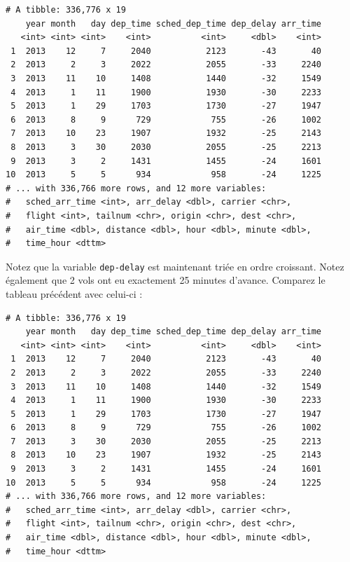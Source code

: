 \documentclass[a4paperpaper,]{article}
\newenvironment{Shaded}{\begin{snugshade}}{\end{snugshade}}
\newcommand{\KeywordTok}[1]{\textcolor[rgb]{0.12,0.11,0.11}{\textbf{#1}}}
\newcommand{\NormalTok}[1]{\textcolor[rgb]{0.12,0.11,0.11}{#1}}
\newcommand{\OperatorTok}[1]{\textcolor[rgb]{0.12,0.11,0.11}{#1}}
\newcommand{\StringTok}[1]{\textcolor[rgb]{0.75,0.01,0.01}{#1}}
\begin{document}
\begin{verbatim}
# A tibble: 336,776 x 19
    year month   day dep_time sched_dep_time dep_delay arr_time
   <int> <int> <int>    <int>          <int>     <dbl>    <int>
 1  2013    12     7     2040           2123       -43       40
 2  2013     2     3     2022           2055       -33     2240
 3  2013    11    10     1408           1440       -32     1549
 4  2013     1    11     1900           1930       -30     2233
 5  2013     1    29     1703           1730       -27     1947
 6  2013     8     9      729            755       -26     1002
 7  2013    10    23     1907           1932       -25     2143
 8  2013     3    30     2030           2055       -25     2213
 9  2013     3     2     1431           1455       -24     1601
10  2013     5     5      934            958       -24     1225
# ... with 336,766 more rows, and 12 more variables:
#   sched_arr_time <int>, arr_delay <dbl>, carrier <chr>,
#   flight <int>, tailnum <chr>, origin <chr>, dest <chr>,
#   air_time <dbl>, distance <dbl>, hour <dbl>, minute <dbl>,
#   time_hour <dttm>
\end{verbatim}

Notez que la variable \texttt{dep-delay} est maintenant triée en ordre croissant. Notez également que 2 vols ont eu exactement 25 minutes d'avance. Comparez le tableau précédent avec celui-ci :

\begin{Shaded}
\end{Shaded}

\begin{verbatim}
# A tibble: 336,776 x 19
    year month   day dep_time sched_dep_time dep_delay arr_time
   <int> <int> <int>    <int>          <int>     <dbl>    <int>
 1  2013    12     7     2040           2123       -43       40
 2  2013     2     3     2022           2055       -33     2240
 3  2013    11    10     1408           1440       -32     1549
 4  2013     1    11     1900           1930       -30     2233
 5  2013     1    29     1703           1730       -27     1947
 6  2013     8     9      729            755       -26     1002
 7  2013     3    30     2030           2055       -25     2213
 8  2013    10    23     1907           1932       -25     2143
 9  2013     3     2     1431           1455       -24     1601
10  2013     5     5      934            958       -24     1225
# ... with 336,766 more rows, and 12 more variables:
#   sched_arr_time <int>, arr_delay <dbl>, carrier <chr>,
#   flight <int>, tailnum <chr>, origin <chr>, dest <chr>,
#   air_time <dbl>, distance <dbl>, hour <dbl>, minute <dbl>,
#   time_hour <dttm>
\end{verbatim}
\end{document}
